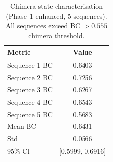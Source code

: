 \begin{table}[t]
\centering
\caption{Chimera state characterisation (Phase~1 enhanced, 5 sequences). All sequences exceed BC $> 0.555$ chimera threshold.}
\label{tab:chimera}
\begin{tabular}{lc}
\toprule
Metric & Value \\
\midrule
Sequence 1 BC & 0.6403 \\
Sequence 2 BC & 0.7256 \\
Sequence 3 BC & 0.6267 \\
Sequence 4 BC & 0.6543 \\
Sequence 5 BC & 0.5683 \\
\midrule
Mean BC & 0.6431 \\
Std & 0.0566 \\
95\% CI & [0.5999, 0.6916] \\
\bottomrule
\end{tabular}
\end{table}